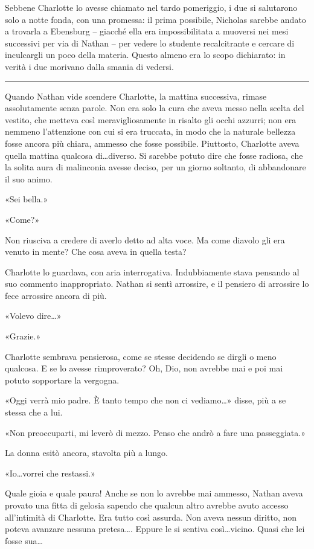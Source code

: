\documentclass[a4paper,oneside,11pt]{memoir}
\begin{document}
Sebbene Charlotte lo avesse chiamato nel tardo pomeriggio, i due si salutarono  solo a notte fonda,
con una promessa: il prima possibile, Nicholas sarebbe  andato a trovarla a Ebensburg -- giacché
ella era impossibilitata a muoversi nei  mesi successivi per via di Nathan -- per vedere lo studente
recalcitrante e cercare di inculcargli un poco della materia. Questo almeno era lo scopo dichiarato:
in verità i due morivano dalla smania di vedersi.

\plainbreak{1}

Quando Nathan vide scendere Charlotte, la mattina successiva, rimase assolutamente senza parole. Non
era solo la cura che aveva messo nella scelta del vestito, che metteva così meravigliosamente in
risalto gli occhi azzurri; non era nemmeno l'attenzione con cui si era truccata, in modo che la
naturale bellezza fosse ancora più chiara, ammesso che fosse possibile. Piuttosto, Charlotte aveva
quella mattina qualcosa di\dots diverso. Si sarebbe potuto dire che fosse radiosa, che la solita
aura di malinconia avesse deciso, per un giorno soltanto, di abbandonare il suo animo.

«Sei bella.»

«Come?»

Non riusciva a credere di averlo detto ad alta voce. Ma come diavolo gli era venuto in mente? Che
cosa aveva in quella testa?

Charlotte lo guardava, con aria interrogativa. Indubbiamente stava pensando al suo commento
inappropriato. Nathan si sentì arrossire, e il pensiero di arrossire lo fece arrossire ancora di
più.

«Volevo dire\dots»

«Grazie.»

Charlotte sembrava pensierosa, come se stesse decidendo se dirgli o meno qualcosa. E se lo avesse
rimproverato? Oh, Dio, non avrebbe mai e poi mai potuto sopportare la vergogna.

«Oggi verrà mio padre. È tanto tempo che non ci vediamo\dots» disse, più a se stessa che a lui.

«Non preoccuparti, mi leverò di mezzo. Penso che andrò a fare una passeggiata.»

La donna esitò ancora, stavolta più a lungo.

«Io\dots vorrei che restassi.»

Quale gioia e quale paura! Anche se non lo avrebbe mai ammesso, Nathan aveva provato una fitta di
gelosia sapendo che qualcun altro avrebbe avuto accesso all'intimità di Charlotte. Era tutto così
assurda. Non aveva nessun diritto, non poteva avanzare nessuna pretesa\dots. Eppure le si sentiva
così\dots vicino. Quasi che lei fosse sua\dots
\end{document}
